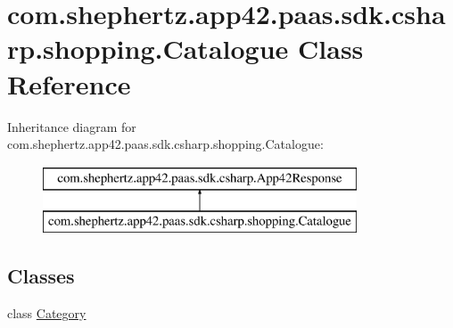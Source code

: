 \hypertarget{classcom_1_1shephertz_1_1app42_1_1paas_1_1sdk_1_1csharp_1_1shopping_1_1_catalogue}{\section{com.\+shephertz.\+app42.\+paas.\+sdk.\+csharp.\+shopping.\+Catalogue Class Reference}
\label{classcom_1_1shephertz_1_1app42_1_1paas_1_1sdk_1_1csharp_1_1shopping_1_1_catalogue}
}
Inheritance diagram for com.\+shephertz.\+app42.\+paas.\+sdk.\+csharp.\+shopping.\+Catalogue\+:\begin{figure}[H]
\begin{center}
\leavevmode
\includegraphics[height=2.000000cm]{classcom_1_1shephertz_1_1app42_1_1paas_1_1sdk_1_1csharp_1_1shopping_1_1_catalogue}
\end{center}
\end{figure}
\subsection*{Classes}
\begin{DoxyCompactItemize}
\item 
class \hyperlink{classcom_1_1shephertz_1_1app42_1_1paas_1_1sdk_1_1csharp_1_1shopping_1_1_catalogue_1_1_category}{Category}
\end{DoxyCompactItemize}
